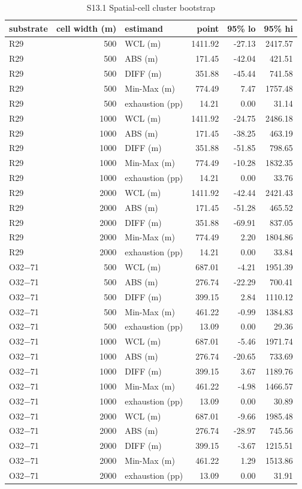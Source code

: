 \documentclass[journal,onecolumn,10pt]{IEEEtran}
\begin{document}
\begin{longtable}[]{@{}lrlrrr@{}}
\caption{S13.1 Spatial-cell cluster bootstrap}\\
\toprule
substrate & cell width (m) & estimand & point & 95\% lo & 95\% hi \\
\midrule
\endhead
\bottomrule
\endlastfoot
R29 & 500 & WCL (m) & 1411.92 & -27.13 & 2417.57 \\
R29 & 500 & ABS (m) & 171.45 & -42.04 & 421.51 \\
R29 & 500 & DIFF (m) & 351.88 & -45.44 & 741.58 \\
R29 & 500 & Min-Max (m) & 774.49 & 7.47 & 1757.48 \\
R29 & 500 & exhaustion (pp) & 14.21 & 0.00 & 31.14 \\
R29 & 1000 & WCL (m) & 1411.92 & -24.75 & 2486.18 \\
R29 & 1000 & ABS (m) & 171.45 & -38.25 & 463.19 \\
R29 & 1000 & DIFF (m) & 351.88 & -51.85 & 798.65 \\
R29 & 1000 & Min-Max (m) & 774.49 & -10.28 & 1832.35 \\
R29 & 1000 & exhaustion (pp) & 14.21 & 0.00 & 33.76 \\
R29 & 2000 & WCL (m) & 1411.92 & -42.44 & 2421.43 \\
R29 & 2000 & ABS (m) & 171.45 & -51.28 & 465.52 \\
R29 & 2000 & DIFF (m) & 351.88 & -69.91 & 837.05 \\
R29 & 2000 & Min-Max (m) & 774.49 & 2.20 & 1804.86 \\
R29 & 2000 & exhaustion (pp) & 14.21 & 0.00 & 33.84 \\
O32$-$71 & 500 & WCL (m) & 687.01 & -4.21 & 1951.39 \\
O32$-$71 & 500 & ABS (m) & 276.74 & -22.29 & 700.41 \\
O32$-$71 & 500 & DIFF (m) & 399.15 & 2.84 & 1110.12 \\
O32$-$71 & 500 & Min-Max (m) & 461.22 & -0.99 & 1384.83 \\
O32$-$71 & 500 & exhaustion (pp) & 13.09 & 0.00 & 29.36 \\
O32$-$71 & 1000 & WCL (m) & 687.01 & -5.46 & 1971.74 \\
O32$-$71 & 1000 & ABS (m) & 276.74 & -20.65 & 733.69 \\
O32$-$71 & 1000 & DIFF (m) & 399.15 & 3.67 & 1189.76 \\
O32$-$71 & 1000 & Min-Max (m) & 461.22 & -4.98 & 1466.57 \\
O32$-$71 & 1000 & exhaustion (pp) & 13.09 & 0.00 & 30.89 \\
O32$-$71 & 2000 & WCL (m) & 687.01 & -9.66 & 1985.48 \\
O32$-$71 & 2000 & ABS (m) & 276.74 & -28.97 & 745.56 \\
O32$-$71 & 2000 & DIFF (m) & 399.15 & -3.67 & 1215.51 \\
O32$-$71 & 2000 & Min-Max (m) & 461.22 & 1.29 & 1513.86 \\
O32$-$71 & 2000 & exhaustion (pp) & 13.09 & 0.00 & 31.91 \\
\end{longtable}
\end{document}

